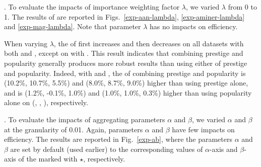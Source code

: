 .
To evaluate the impacts of importance weighting factor $\lambda$, we varied $\lambda$ from 0 to 1.
The results of \PairAcc are reported in Figs.~\ref{exp-aan-lambda}, \ref{exp-aminer-lambda} and \ref{exp-mag-lambda}. Note that parameter $\lambda$ has no impacts on efficiency.

When varying $\lambda$, the \PairAcc of \ensemblerank first increases and then decreases on all datasets with both \fcita and \recom, except on \aminer with \recom.
This result indicates that combining prestige and popularity generally produces more robust results than using either of prestige and popularity.
Indeed, with \recom and \fcita, the \PairAcc of combining prestige and popularity is (10.2\%, 10.7\%, 5.5\%) and (8.0\%, 8.7\%, 9.0\%) higher than using prestige alone, and is (1.2\%, -0.1\%, 1.0\%) and (1.0\%, 1.0\%, 0.3\%) higher than using popularity alone on (\aan, \aminer, \magdata), respectively.







.
To evaluate the impacts of aggregating parameters $\alpha$ and $\beta$, we varied $\alpha$ and $\beta$ at the granularity of 0.01. Again, parameters $\alpha$ and $\beta$ have few impacts on efficiency. The results are reported in Fig.~\ref{exp-ab}, where the parameters $\alpha$ and $\beta$ are set by default (used earlier) to the corresponding values of $\alpha$-axis and $\beta$-axis of the \PairAcc marked with $\star$, respectively.


